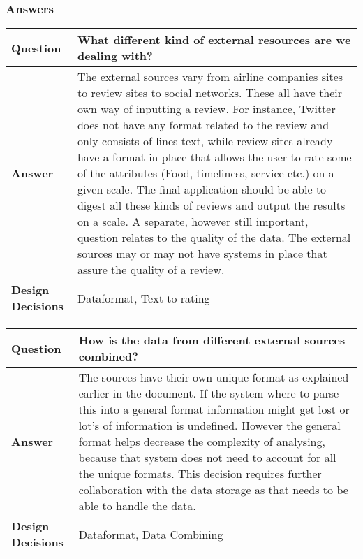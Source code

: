 \newpage
\subsubsection{Answers}
\begin{longtable}{| l |  p{12cm} |}
\hline
\textbf{Question} & \textbf{What different kind of external resources are we dealing with?} \\ \hline
\textbf{Answer} &
	The external sources vary from airline companies sites to review sites to social networks. These all have their own way of inputting a review. For instance, Twitter does not have any format related to the review and only consists of lines text, while review sites already have a format in place that allows the user to rate some of the attributes (Food, timeliness, service etc.) on a given scale. The final application should be able to digest all these kinds of reviews and output the results on a scale.
A separate, however still important, question relates to the quality of the data. The external sources may or may not have systems in place that assure the quality of a review.
 \\ \hline
\textbf{Design Decisions} & Dataformat, Text-to-rating \\ \hline
\end{longtable}

\begin{longtable}{| l |  p{12cm} |}
\hline
\textbf{Question} & \textbf{How is the data from different external sources combined?} \\ \hline
\textbf{Answer} &
	The sources have their own unique format as explained earlier in the document. If the system where to parse this into a general format information might get lost or lot's of information is undefined.
However the general format helps decrease the complexity of analysing, because that system does not need to account for all the unique formats. This decision requires further collaboration with the data storage as that needs to be able to handle the data.
 \\ \hline
\textbf{Design Decisions} & Dataformat, Data Combining \\ \hline
\end{longtable}

